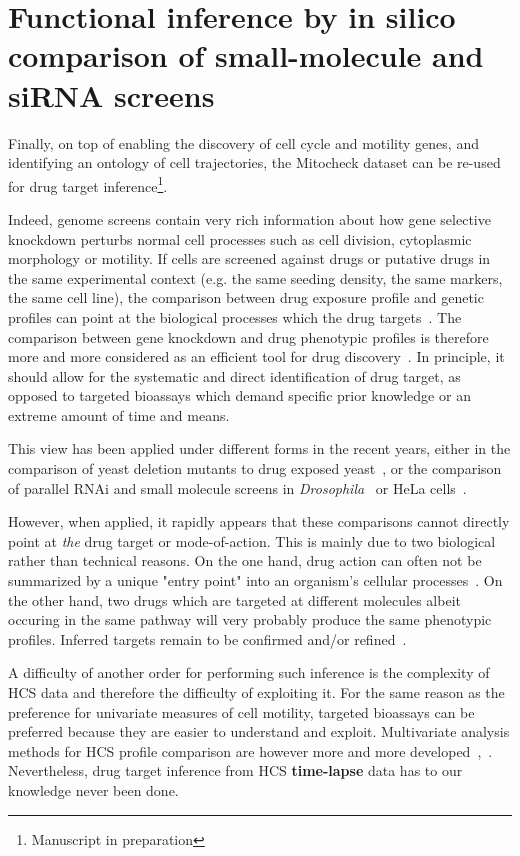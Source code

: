 \section{Functional inference by in silico comparison of small-molecule and siRNA screens}
\label{target_inference}
Finally, on top of enabling the discovery of cell cycle and motility genes, and identifying an ontology of cell trajectories, the Mitocheck dataset can be re-used for drug target inference\footnote{Manuscript in preparation}.

Indeed, genome screens contain very rich information about how gene selective knockdown perturbs normal cell processes such as cell division, cytoplasmic morphology or motility. If cells are screened against drugs or putative drugs in the same experimental context (e.g. the same seeding density, the same markers, the same cell line), the comparison between drug exposure profile and genetic profiles can point at the biological processes which the drug targets~\cite{pmid16901791}. The comparison between gene knockdown and drug phenotypic profiles is therefore more and more considered as an efficient tool for drug discovery~\cite{pmid19568283}. In principle, it should allow for the systematic and direct identification of drug target, as opposed to targeted bioassays which demand specific prior knowledge or an extreme amount of time and means.

This view has been applied under different forms in the recent years, either in the comparison of yeast deletion mutants to drug exposed yeast~\cite{pmid20418956}, or the comparison of parallel RNAi and small molecule screens in \textit{Drosophila}~\cite{pmid16901791} or HeLa cells~\cite{pmid18066055}.

However, when applied, it rapidly appears that these comparisons cannot directly point at \textit{the} drug target or mode-of-action. This is mainly due to two biological rather than technical reasons. On the one hand, drug action can often not be summarized by a unique "entry point" into an organism's cellular processes~\cite{pmid26272035}. On the other hand, two drugs which are targeted at different molecules albeit occuring in the same pathway will very probably produce the same phenotypic profiles. Inferred targets remain to be confirmed and/or refined~\cite{pmid23508189}.

A difficulty of another order for performing such inference is the
complexity of HCS data and therefore the difficulty of exploiting
it. For the same reason as the preference for univariate measures of
cell motility, targeted bioassays can be preferred because they are
easier to understand and exploit. Multivariate analysis methods for
HCS profile comparison are however more and more
developed~\cite{pmid17401369},~\cite{pmid18066055}. Nevertheless, drug
target inference from HCS \textbf{time-lapse} data has to our
knowledge never been done.

